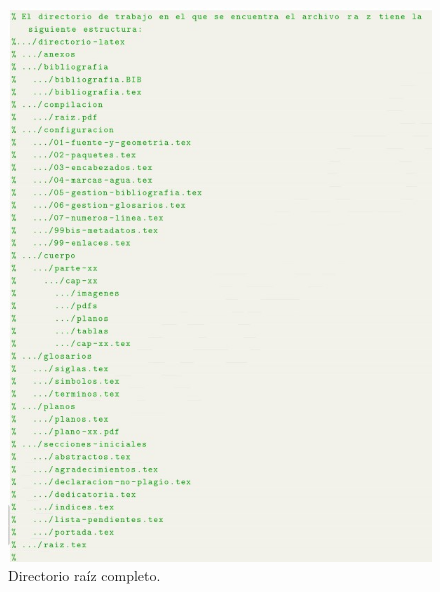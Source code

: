 \begin{figure}[h]
	\centering
	\includegraphics[scale=1, frame]{cuerpo/cap-directorio/imagenes/directorio-raiz-completo}
	\caption[Directorio raíz completo.]{Directorio raíz completo.}
	\label{fig:directorio-raiz-completo}
\end{figure}